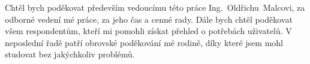 \documentclass[czech,bachelor,unicode]{template/ctufit-thesis}
\theoremstyle{plain}
\theoremstyle{definition}
\theoremstyle{remark}
\numberwithin{theorem}{chapter}
\begin{document}
\frontmatter\frontmatterinit %


\thispagestyle{empty}\cleardoublepage\maketitle %

\imprintpage %

\tableofcontents %
\listoffigures %
\begingroup
\let\clearpage\relax
\listoftables %
\listoflistings %
\endgroup

\begin{acknowledgmentpage}
	Chtěl bych poděkovat především vedoucímu této práce Ing.~Oldřichu~Malcovi, za odborné vedení mé práce, za jeho čas a cenné rady.
    Dále bych chtěl poděkovat všem respondentům, kteří mi pomohli získat přehled o potřebách uživatelů. V neposlední řadě patří obrovské
    poděkování mé rodině, díky které jsem mohl studovat bez jakýchkoliv problémů.
\end{acknowledgmentpage}
\end{document}
